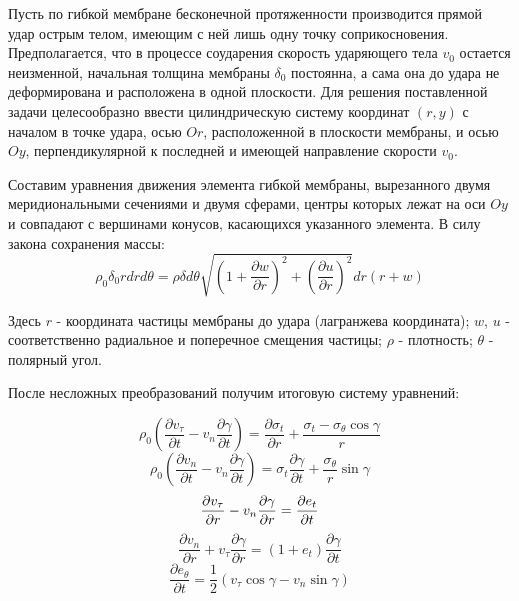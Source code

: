 Пусть по гибкой мембране бесконечной протяженности производится прямой удар острым телом, имеющим с ней лишь одну
точку соприкосновения.
Предполагается, что в процессе соударения скорость ударяющего тела $v_0$ остается неизменной, начальная толщина
мембраны $\delta_0$ постоянна, а сама она до удара не деформирована и расположена в одной плоскости.
Для решения поставленной задачи целесообразно ввести цилиндрическую систему координат $(r,y)$ с началом в точке удара,
осью $Or$, расположенной в плоскости мембраны, и осью $Oy$, перпендикулярной к последней и имеющей направление скорости
$v_0$.

Составим уравнения движения элемента гибкой мембраны, вырезанного двумя меридиональными сечениями и двумя сферами,
центры которых лежат на оси $Oy$ и совпадают с вершинами конусов, касающихся указанного элемента.
В силу закона сохранения массы:
\begin{equation}
    \rho_0 \delta_0 r dr d\theta = \rho \delta d\theta \sqrt{\left( 1 + \dfrac{\partial w}{\partial r} \right) ^ 2 + \left( \dfrac{\partial u}{\partial r} \right) ^ 2} dr (r + w)
\end{equation}

Здесь $r$ - координата частицы мембраны до удара (лагранжева координата); $w$, $u$ - соответственно радиальное и
поперечное смещения частицы; $\rho$ - плотность; $\theta$ - полярный угол.

После несложных преобразований получим итоговую систему уравнений:

\begin{equation}
    \rho_0 \left( \dfrac{\partial v_{\tau}}{\partial t} - v_n \dfrac{\partial \gamma}{\partial t} \right) = \dfrac{\partial \sigma_t}{\partial r} + \dfrac{\sigma_t - \sigma_{\theta} \cos{\gamma}}{r}
\end{equation}
\begin{equation}
    \rho_0 \left( \dfrac{\partial v_n}{\partial t} - v_n \dfrac{\partial \gamma}{\partial t} \right) = \sigma_t \dfrac{\partial \gamma}{\partial t} + \dfrac{\sigma_{\theta}}{r} \sin{\gamma}
\end{equation}
\begin{equation}
    \dfrac{\partial v_{\tau}}{\partial r} - v_n \dfrac{\partial \gamma}{\partial r} = \dfrac{\partial e_t}{\partial t} \\
\end{equation}
\begin{equation}
    \dfrac{\partial v_n}{\partial r} + v_{\tau} \dfrac{\partial \gamma}{\partial r} = \left( 1 + e_t \right) \dfrac{\partial \gamma}{\partial t}
\end{equation}
\begin{equation}
    \dfrac{\partial e_{\theta}}{\partial t} = \dfrac{1}{2} \left( v_{\tau} \cos{\gamma} - v_n \sin{\gamma} \right)
\end{equation}

